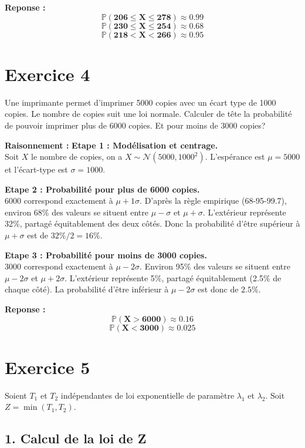 \documentclass[11pt,a4paper]{article}
\begin{document}
\textbf{Reponse :}
$$ \mathbf{\mathbb{P}(206 \le X \le 278) \approx 0.99} $$
$$ \mathbf{\mathbb{P}(230 \le X \le 254) \approx 0.68} $$
$$ \mathbf{\mathbb{P}(218 < X < 266) \approx 0.95} $$

\hrulefill

\section*{Exercice 4}

Une imprimante permet d'imprimer 5000 copies avec un écart type de 1000 copies. Le nombre de copies suit une loi normale. Calculer de tête la probabilité de pouvoir imprimer plus de 6000 copies. Et pour moins de 3000 copies?

\textbf{Raisonnement :}
\textbf{Etape 1 : Modélisation et centrage.}\\
Soit $X$ le nombre de copies, on a $X \sim \mathcal{N}(5000, 1000^2)$. L'espérance est $\mu = 5000$ et l'écart-type est $\sigma = 1000$.

\textbf{Etape 2 : Probabilité pour plus de 6000 copies.}\\
$6000$ correspond exactement à $\mu + 1\sigma$. D'après la règle empirique (68-95-99.7), environ 68\% des valeurs se situent entre $\mu - \sigma$ et $\mu + \sigma$. L'extérieur représente 32\%, partagé équitablement des deux côtés. Donc la probabilité d'être supérieur à $\mu + \sigma$ est de $32\% / 2 = 16\%$.

\textbf{Etape 3 : Probabilité pour moins de 3000 copies.}\\
$3000$ correspond exactement à $\mu - 2\sigma$. Environ 95\% des valeurs se situent entre $\mu - 2\sigma$ et $\mu + 2\sigma$. L'extérieur représente 5\%, partagé équitablement (2.5\% de chaque côté). La probabilité d'être inférieur à $\mu - 2\sigma$ est donc de $2.5\%$.

\textbf{Reponse :}
$$ \mathbf{\mathbb{P}(X > 6000) \approx 0.16} $$
$$ \mathbf{\mathbb{P}(X < 3000) \approx 0.025} $$

\hrulefill

\section*{Exercice 5}

Soient $T_1$ et $T_2$ indépendantes de loi exponentielle de paramètre $\lambda_1$ et $\lambda_2$. Soit $Z=\min(T_1,T_2)$.

\subsection*{1. Calcul de la loi de Z}
\end{document}
